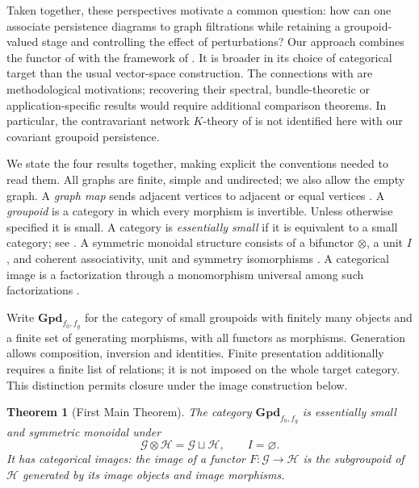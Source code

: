 \documentclass{amsart}
\newtheorem{theorem}{Theorem}[section]
\begin{document}
Taken together, these perspectives motivate a common question: how can one associate persistence diagrams to graph filtrations while retaining a groupoid-valued stage and controlling the effect of perturbations? Our approach combines the functor of \cite{kapulkin_grupoid} with the framework of \cite{patel2016generalized}. It is broader in its choice of categorical target than the usual vector-space construction. The connections with \cite{badadoru,barusp,martinealessandro} are methodological motivations; recovering their spectral, bundle-theoretic or application-specific results would require additional comparison theorems. In particular, the contravariant network $K$-theory of \cite{barusp} is not identified here with our covariant groupoid persistence.

We state the four results together, making explicit the conventions needed to read them. All graphs are finite, simple and undirected; we also allow the empty graph. A \emph{graph map} sends adjacent vertices to adjacent or equal vertices \cite[Definitions~1.1--1.2]{kapulkin_grupoid}. A \emph{groupoid} is a category in which every morphism is invertible. Unless otherwise specified it is small. A category is \emph{essentially small} if it is equivalent to a small category; see \cite[Section~IV.4]{maclane1998categories}. A symmetric monoidal structure consists of a bifunctor $\otimes$, a unit $I$, and coherent associativity, unit and symmetry isomorphisms \cite[Sections~VII.1 and XI.1]{maclane1998categories}. A categorical image is a factorization through a monomorphism universal among such factorizations \cite[Section~2, p.~399]{patel2016generalized}.

Write $\mathbf{Gpd}_{f_0,f_g}$ for the category of small groupoids with finitely many objects and a finite set of generating morphisms, with all functors as morphisms. Generation allows composition, inversion and identities. Finite presentation additionally requires a finite list of relations; it is not imposed on the whole target category. This distinction permits closure under the image construction below.

\begin{theorem}[First Main Theorem]\label{main1}
The category $\mathbf{Gpd}_{f_0,f_g}$ is essentially small and symmetric monoidal under
\[
\mathcal G\otimes\mathcal H=\mathcal G\sqcup\mathcal H,
\qquad I=\varnothing.
\]
It has categorical images: the image of a functor $F:\mathcal G\to\mathcal H$ is the subgroupoid of $\mathcal H$ generated by its image objects and image morphisms.
\end{theorem}
\end{document}
